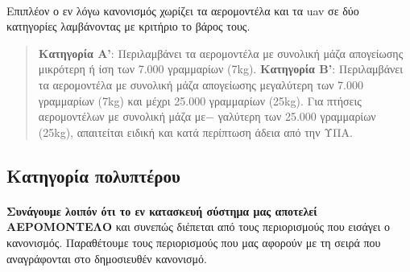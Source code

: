 \documentclass[a4paper, 12pt, twoside]{report}
\begin{document}
{{{{{{			\paragraph{}{Επιπλέον ο εν λόγω κανονισμός χωρίζει τα αερομοντέλα και τα uav σε δύο κατηγορίες λαμβάνοντας με κριτήριο το βάρος τους.
			\begin{quote}
				\textbf{Κατηγορία Α'}: Περιλαμβάνει τα αερομοντέλα με συνολική μάζα απογείωσης μικρότερη ή ίση των 7.000 γραμμαρίων (7kg).\linebreak
				\textbf{Κατηγορία Β'}: Περιλαμβάνει τα αερομοντέλα με συνολική μάζα απογείωσης μεγαλύτερη των 7.000 γραμμαρίων (7kg) και μέχρι 25.000 γραμμαρίων (25kg).\linebreak
				Για πτήσεις αερομοντέλων με συνολική μάζα με−
γαλύτερη των 25.000 γραμμαρίων (25kg), απαιτείται ειδική και κατά περίπτωση άδεια από την ΥΠΑ.
			\end{quote}
			}
			
		\subsection{Κατηγορία πολυπτέρου}
			\paragraph{}{\textbf{Συνάγουμε λοιπόν ότι το εν κατασκευή σύστημα μας αποτελεί ΑΕΡΟΜΟΝΤΕΛΟ} και συνεπώς διέπεται από τους περιορισμούς που εισάγει ο κανονισμός. Παραθέτουμε τους περιορισμούς που μας αφορούν με τη σειρά που αναγράφονται στο δημοσιευθέν κανονισμό.
			}

}}}}}}
\end{document}
